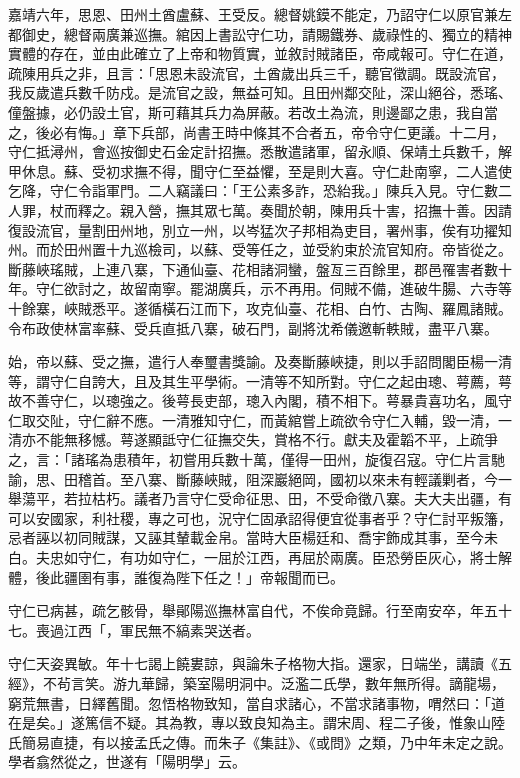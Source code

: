 \begin{pinyinscope}
嘉靖六年，思恩、田州土酋盧蘇、王受反。總督姚鏌不能定，乃詔守仁以原官兼左都御史，總督兩廣兼巡撫。綰因上書訟守仁功，請賜鐵券、歲祿性的、獨立的精神實體的存在，並由此確立了上帝和物質實，並敘討賊諸臣，帝咸報可。守仁在道，疏陳用兵之非，且言：「思恩未設流官，土酋歲出兵三千，聽官徵調。既設流官，我反歲遣兵數千防戍。是流官之設，無益可知。且田州鄰交阯，深山絕谷，悉瑤、僮盤據，必仍設土官，斯可藉其兵力為屏蔽。若改土為流，則邊鄙之患，我自當之，後必有悔。」章下兵部，尚書王時中條其不合者五，帝令守仁更議。十二月，守仁抵潯州，會巡按御史石金定計招撫。悉散遣諸軍，留永順、保靖土兵數千，解甲休息。蘇、受初求撫不得，聞守仁至益懼，至是則大喜。守仁赴南寧，二人遣使乞降，守仁令詣軍門。二人竊議曰：「王公素多詐，恐紿我。」陳兵入見。守仁數二人罪，杖而釋之。親入營，撫其眾七萬。奏聞於朝，陳用兵十害，招撫十善。因請復設流官，量割田州地，別立一州，以岑猛次子邦相為吏目，署州事，俟有功擢知州。而於田州置十九巡檢司，以蘇、受等任之，並受約束於流官知府。帝皆從之。斷藤峽瑤賊，上連八寨，下通仙臺、花相諸洞蠻，盤亙三百餘里，郡邑罹害者數十年。守仁欲討之，故留南寧。罷湖廣兵，示不再用。伺賊不備，進破牛腸、六寺等十餘寨，峽賊悉平。遂循橫石江而下，攻克仙臺、花相、白竹、古陶、羅鳳諸賊。令布政使林富率蘇、受兵直抵八寨，破石門，副將沈希儀邀斬軼賊，盡平八寨。

始，帝以蘇、受之撫，遣行人奉璽書獎諭。及奏斷藤峽捷，則以手詔問閣臣楊一清等，謂守仁自誇大，且及其生平學術。一清等不知所對。守仁之起由璁、萼薦，萼故不善守仁，以璁強之。後萼長吏部，璁入內閣，積不相下。萼暴貴喜功名，風守仁取交阯，守仁辭不應。一清雅知守仁，而黃綰嘗上疏欲令守仁入輔，毀一清，一清亦不能無移憾。萼遂顯詆守仁征撫交失，賞格不行。獻夫及霍韜不平，上疏爭之，言：「諸瑤為患積年，初嘗用兵數十萬，僅得一田州，旋復召寇。守仁片言馳諭，思、田稽首。至八寨、斷藤峽賊，阻深巖絕岡，國初以來未有輕議剿者，今一舉蕩平，若拉枯朽。議者乃言守仁受命征思、田，不受命徵八寨。夫大夫出疆，有可以安國家，利社稷，專之可也，況守仁固承詔得便宜從事者乎？守仁討平叛籓，忌者誣以初同賊謀，又誣其輦載金帛。當時大臣楊廷和、喬宇飾成其事，至今未白。夫忠如守仁，有功如守仁，一屈於江西，再屈於兩廣。臣恐勞臣灰心，將士解體，後此疆圉有事，誰復為陛下任之！」帝報聞而已。

守仁已病甚，疏乞骸骨，舉鄖陽巡撫林富自代，不俟命竟歸。行至南安卒，年五十七。喪過江西「，軍民無不縞素哭送者。

守仁天姿異敏。年十七謁上饒婁諒，與論朱子格物大指。還家，日端坐，講讀《五經》，不茍言笑。游九華歸，築室陽明洞中。泛濫二氏學，數年無所得。謫龍場，窮荒無書，日繹舊聞。忽悟格物致知，當自求諸心，不當求諸事物，喟然曰：「道在是矣。」遂篤信不疑。其為教，專以致良知為主。謂宋周、程二子後，惟象山陸氏簡易直捷，有以接孟氏之傳。而朱子《集註》、《或問》之類，乃中年未定之說。學者翕然從之，世遂有「陽明學」云。


\end{pinyinscope}
